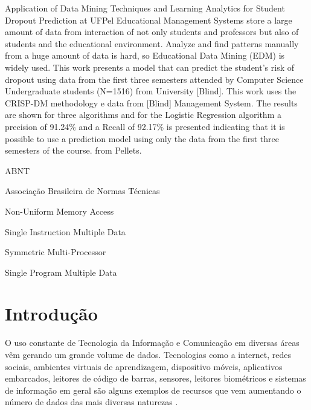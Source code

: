 \documentclass[diss,capa]{texufpel}
\begin{document}
\begin{englishabstract}{Application of Data Mining Techniques and Learning Analytics for Student Dropout Prediction at UFPel}
Educational Management Systems store a large amount of data from interaction of not only students and professors but also of students and the educational environment. Analyze and find patterns manually from a huge amount of data is hard, so Educational Data Mining (EDM) is widely used. This work presents a model that can predict the student's risk of dropout using data from the first three semesters attended by Computer Science Undergraduate students (N=1516) from University [Blind]. This work uses the CRISP-DM methodology e data from [Blind] Management System. The results are shown for three algorithms and for the Logistic Regression algorithm a precision of 91.24\% and a Recall of 92.17\% is presented indicating that it is possible to use a prediction model using only the data from the first three semesters of the course. from Pellets.
\end{englishabstract}

\listoffigures

\listoftables

\begin{listofabbrv}{ABNT}%
        \item[ABNT] Associação Brasileira de Normas Técnicas
        \item[NUMA] Non-Uniform Memory Access
        \item[SIMD] Single Instruction Multiple Data
        \item[SMP] Symmetric Multi-Processor
        \item[SPMD] Single Program Multiple Data
\end{listofabbrv}

\tableofcontents

\chapter{Introdução}

    O uso constante de Tecnologia da Informação e Comunicação em diversas áreas vêm gerando um grande volume de dados.
    Tecnologias como a internet, redes sociais, ambientes virtuais de aprendizagem, dispositivo móveis, aplicativos embarcados, leitores de código de barras, sensores, leitores biométricos e sistemas de informação em geral são alguns exemplos de recursos que vem aumentando o número de dados das mais diversas naturezas \cite{goldschmidt2015data}.
\end{document}
